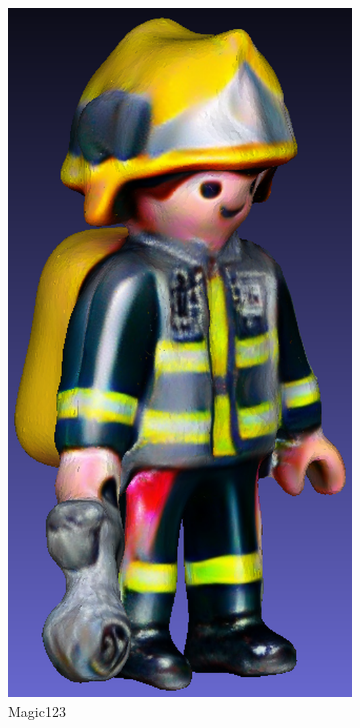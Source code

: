 \begin{figure}[ht]
\begin{subfigure}[b]{0.192\textwidth}
        \includegraphics[width=\textwidth]{figures/subjective/magic123_playmobil_result_resize.png}
        \caption{Magic123}
    \end{subfigure}
    \begin{subfigure}[b]{0.181\textwidth}

\end{subfigure}
\end{figure}
